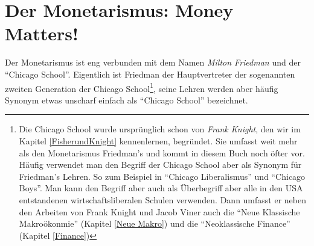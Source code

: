 %
%
%

\chapter{Der Monetarismus: Money Matters!}
\label{Monetarismus}

Der Monetarismus ist eng verbunden mit dem Namen \textit{Milton Friedman} und der "`Chicago School"'. Eigentlich ist Friedman der Hauptvertreter der sogenannten zweiten Generation der Chicago School\footnote{Die Chicago School wurde ursprünglich schon von \textit{Frank Knight}, den wir im Kapitel \ref{FisherundKnight} kennenlernen, begründet. Sie umfasst weit mehr als den Monetarismus Friedman's und kommt in diesem Buch noch öfter vor. Häufig verwendet man den Begriff der Chicago School aber als Synonym für Friedman's Lehren. So zum Beispiel in "`Chicago Liberalismus"' und "`Chicago Boys"'. Man kann den Begriff aber auch als Überbegriff aber alle in den USA entstandenen wirtschaftsliberalen Schulen verwenden. Dann umfasst er neben den Arbeiten von Frank Knight und Jacob Viner auch die "`Neue Klassische Makroökonmie"' (Kapitel \ref{Neue Makro}) und die "`Neoklassische Finance"' (Kapitel \ref{Finance})}, seine Lehren werden aber häufig Synonym etwas unscharf einfach als "`Chicago School"' bezeichnet. 

